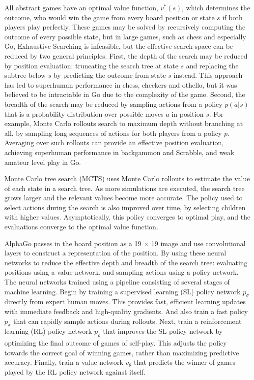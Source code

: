 \documentclass[12pt,a4paper]{report}
\begin{document}
{\hspace{0cm} All abstract games have an optimal value function, \(v^\ast(s)\), which determines the outcome, who would win the game from every board position or state \(s\) if both players play perfectly. These games may be solved by recursively computing the outcome of every possible state, but in large games, such as chess\cite{AISearching} and especially Go\cite{AISearching}, Exhaustive Searching is infeasible\cite{Solved}\cite{Thegamesplay}, but the effective search space can be reduced by two general principles. First, the depth of the search may be reduced by position evaluation: truncating the search tree at state \(s\) and replacing the subtree below \(s\) by predicting the outcome from state \(s\) instead. This approach has led to superhuman performance in chess\cite{DeepBlue}, checkers\cite{Caliber} and othello\cite{BuroOth}, but it was believed to be intractable in Go due to the complexity of the game\cite{MullerComGo}. Second, the breadth of the search may be reduced by sampling actions from a policy \(p(a|s)\) that is a probability distribution over possible moves \(a\) in position \(s\). For example, Monte Carlo rollouts\cite{MCR} search to maximum depth without branching at all, by sampling long sequences of actions for both players from a policy \(p\). Averaging over such rollouts can provide an effective position evaluation, achieving superhuman performance in backgammon\cite{MCR} and Scrabble\cite{Scrabble}, and weak amateur level play in Go\cite{Bouzy_2004}.\par
\hspace{0cm} Monte Carlo tree search (MCTS)\cite{CoulomMCTS}\cite{KocsisMCTS} uses Monte Carlo rollouts to estimate the value of each state in a search tree. As more simulations are executed, the search tree grows larger and the relevant values become more accurate. The policy used to select actions during the search is also improved over time, by selecting children with higher values. Asymptotically, this policy converges to optimal play, and the evaluations converge to the optimal value function\cite{KocsisMCTS}. \par
AlphaGo passes in the board position as a 19 × 19 image and use convolutional layers to construct a representation of the position. By using these neural networks to reduce the effective depth and breadth of the search tree: evaluating positions using a value network, and sampling actions using a policy network. The neural networks trained using a pipeline consisting of several stages of machine learning. Begin by training a supervised learning (SL) policy network \(p_\sigma\) directly from expert human moves. This provides fast, efficient learning updates with immediate feedback and high-quality gradients. And also train a fast policy \(p_\pi\) that can rapidly sample actions during rollouts. Next, train a reinforcement learning (RL) policy network \(p_\rho\) that improves the SL policy network by optimizing the final outcome of games of self-play. This adjusts the policy towards the correct goal of winning games, rather than maximizing predictive accuracy. Finally, train a value network \(v_\theta\) that predicts the winner of games played by the RL policy network against itself.\par
}
\end{document}
